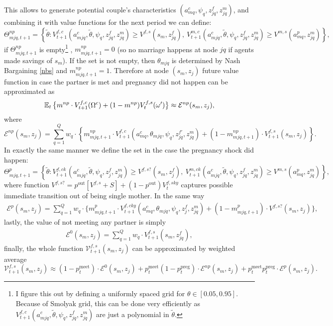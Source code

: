 This allows to generate potential couple's characteristics $(a^c_{mq},\psi_q,z^{f}_{jq},z^{m}_{jq})$, and combining it with value functions for the next period we can define:
\[\Theta^{np}_{mjq,t+1} = \left\{ \tilde\theta : V^{f,c}_{t+1}(a^c_{mjq}, \tilde\theta, \psi_q,z^{f}_{jq},z^{m}_{jq}) \geq V^{f,s}(s_m,z^f_{jq}), \ V^{m,c}_{t+1}(a^c_{mjq}, \tilde\theta, \psi_q,z^{f}_{jq},z^{m}_{jq}) \geq V^{m,s}(a^p_{mq},z^m_{jq}) \right\},\]
if $\Theta^{np}_{mjq,t+1}$ is empty\footnote{I figure this out by defining a uniformly spaced grid for $\theta \in [0.05,0.95]$. Because of Smolyak grid, this can be done very efficiently as $V^{f,c}_{t+1}(a^c_{mjq}, \tilde\theta, \psi_q,z^{f}_{jq},z^{m}_{jq})$ are just a polynomial in $\tilde{\theta}$.}
, $m^{np}_{mjq,t+1} = 0$ (so no marriage happens at node $jq$ if agents made savings of $s_m$). If the set is not empty, then $\theta_{mjq}$ is determined by Nash Bargaining \ref{nbs} and $m^{np}_{mjq,t+1} = 1$. Therefore at node $(s_m,z_j)$ future value function in case the partner is met and pregnancy did not happen can be approximated as
\[\operatorname{\mathbb{E}}_t  \big\{ m^{np} \cdot V^{f,c}_{t+1}(\Omega^c) + (1-m^{np})V^{f,s}_t(\omega')\big\} \approx \mathcal{E}^{np}(s_m,z_j),\]
where
\[\mathcal{E}^{np}(s_m,z_j) = \sum\limits_{q=1}^{Q} w_q \cdot \left\{ m^{np}_{mjq,t+1}\cdot V^{f,c}_{t+1}(a^c_{mq},\theta_{mjq},\psi_q,z^{f\prime}_{jq},z^m_{jq}) + (1-m^{np}_{mjq,t+1})\cdot V^{f,s}_{t+1}(s_m,z_j)\right\}.\]
In exactly the same manner we define the set in the case the pregnancy shock did happen:
\[\Theta^{p}_{mjq,t+1} = \left\{ \tilde\theta : V^{f,ck}_{t+1}(a^c_{mjq}, \tilde\theta, \psi_q,z^{f}_j,z^{m}_{jq}) \geq V^{f,s?}(s_m,z^f_{j}), \ V^{m,ck}_{t+1}(a^c_{mjq}, \tilde\theta, \psi_q,z^{f}_{jq},z^{m}_{jq}) \geq V^{m,s}(a^p_{mq},z^m_{jq}) \right\},\]
where function $V^{f,s?} = p^{\text{out}}[V^{f,s} + S] + (1-p^{\text{out}})V^{f,sky}_t$ captures possible immediate transition out of being single mother. In the same way 
\begin{align*}\mathcal{E}^{p}(s_m,z_j) = \sum\limits_{q=1}^{Q} w_q \cdot  \Big\{ m^{p}_{mjq,t+1}\cdot V^{f,cky}_{t+1}(a^c_{mq},\theta_{mjq},\psi_q,z^f_j,z^m_{jq}) + (1-m^{p}_{mjq,t+1})\cdot V^{f,s?}(s_m,z_j) \Big\},
\end{align*}
lastly, the value of not meeting any partner is simply
\begin{align*}\mathcal{E}^{0}(s_m,z_j) = \sum\limits_{q=1}^{Q} w_q \cdot  V^{f,s}_{t+1}(s_m,z^f_{jq}),
\end{align*}
finally, the whole function $\mathcal{V}^{f,s}_{t+1}(s_m,z_j)$ can be approximated by weighted average
\[\mathcal{V}^{f,s}_{t+1}(s_m,z_j) \approx (1-p^{\text{meet}}_t) \cdot \mathcal{E}^{0}(s_m,z_j) +  p^{\text{meet}}_t(1-p^{\text{preg}}_t)  \cdot \mathcal{E}^{np}(s_m,z_j) 
+  p^{\text{meet}}_t p^{\text{preg}}_t  \cdot \mathcal{E}^{p}(s_m,z_j).\]

